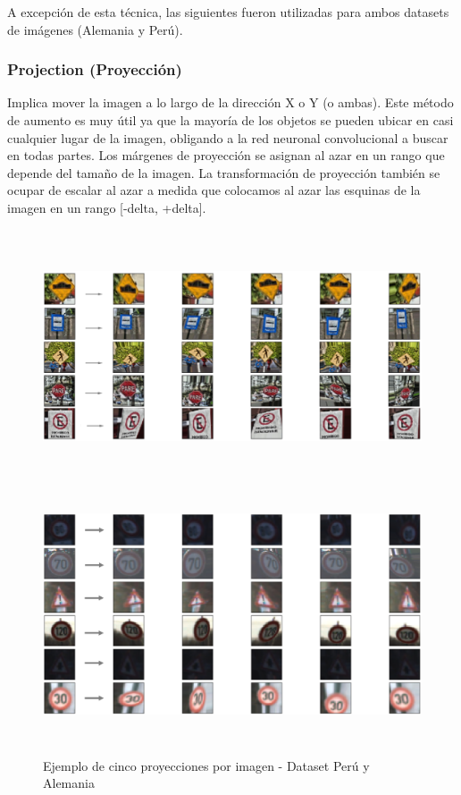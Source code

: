 		A excepción de esta técnica, las siguientes fueron utilizadas para ambos datasets de imágenes (Alemania y Perú).
		
		\subsubsection{Projection (Proyección)}
			Implica mover la imagen a lo largo de la dirección X o Y (o ambas). Este método de aumento es muy útil ya que la mayoría de los objetos se pueden ubicar en casi cualquier lugar de la imagen, obligando a la red neuronal convolucional a buscar en todas partes. Los márgenes de proyección se asignan al azar en un rango que depende del tamaño de la imagen. La transformación de proyección también se ocupar de escalar al azar a medida que colocamos al azar las esquinas de la imagen en un rango [-delta, +delta].

			\begin{figure}[H]
				\begin{center}
				\includegraphics[width=1\textwidth,height=7.5cm]{images/desarrollo/Augment/projection_transform3}
				\includegraphics[width=1\textwidth,height=7.5cm]{images/desarrollo/Augment/projection_transform}
				\end{center}
				\begin{center}
				\vspace{1em}
				\caption{\small{Ejemplo de cinco proyecciones por imagen - Dataset Perú y Alemania}}	
				{\small{\fontsize{10}{16.8}\selectfont {Fuente: Elaboración propia}}}
				\end{center}
				\vspace{-1.5em}
			\end{figure}
		\newpage
